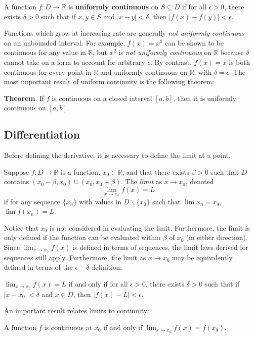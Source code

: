 \begin{defn}
    A function $f:D\to\mathbb{R}$ is \textbf{uniformly continuous} on $S\subseteq D$ if for all $\epsilon>0$, there exists $\delta>0$ such that if $x,y\in S$ and $|x-y|<\delta$, then $|f(x)-f(y)|<\epsilon$.
\end{defn}

Functions which grow at increasing rate are generally \textit{not uniformly continuous} on an unbounded interval. For example, $f(x)=x^2$ can be shown to be continuous for any value in $\mathbb{R}$, but $x^2$ is \textit{not uniformly continuous} on $\mathbb{R}$ because $\delta$ cannot take on a form to account for arbitrary $\epsilon$. By contrast, $f(x) = x$ is both continuous for every point in $\mathbb{R}$ and uniformly continuous on $\mathbb{R}$, with $\delta = \epsilon$. The most important result of uniform continuity is the following theorem:

\textbf{Theorem}. If $f$ is continuous on a closed interval $[a,b]$, then it is uniformly continuous on $[a,b]$.

\subsection{Differentiation}

Before defining the derivative, it is necessary to define the limit at a point.

\begin{shaded}
\begin{defn}
    Suppose $f:D\to \mathbb{R}$ is a function, $x_0\in\mathbb{R}$, and that there exists $\beta>0$ such that $D$ contains $(x_0-\beta, x_0)\cup(x_0,x_0+\beta)$. The \textit{limit} as $x\to x_0$, denoted \[\lim_{x\to x_0} f(x)= L\] if for any sequence $\{x_n\}$ with values in $D\backslash\{x_0\}$ such that $\lim x_n = x_0$, $\lim f(x_n)=L$.
\end{defn}

Notice that $x_0$ is not considered in evaluating the limit. Furthermore, the limit is only defined if the function can be evaluated within $\beta$ of $x_0$ (in either direction). Since $\displaystyle\lim_{x\to x_0}f(x)$ is defined in terms of sequences, the limit laws derived for sequences still apply. Furthermore, the limit as $x\to x_0$ may be equivalently defined in terms of the $\epsilon-\delta$ definition:\\

\begin{theorem*}
    $\displaystyle\lim_{x\to x_0} f(x) = L$ if and only if for all $\epsilon > 0$, there exists $\delta > 0$ such that if $|x-x_0|<\delta$ and $x\in D$, then $|f(x)- L|<\epsilon$.
\end{theorem*}

An important result relates limits to continuity:\\

\begin{theorem*}
    A function $f$ is continuous at $x_0$ if and only if $\displaystyle\lim_{x\to x_0} f(x) = f(x_0)$.
\end{theorem*}
\end{shaded}

